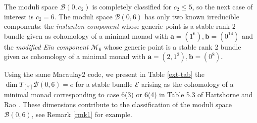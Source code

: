 \documentclass[twoside,reqno]{amsart}
\theoremstyle{plain}
\newcommand{\E}{\mathcal{E}}
\begin{document}
The moduli space $\mathcal{B}(0,c_2)$ is completely classified for $c_2\leq5$, so the next case of interest 
is $c_2=6$. The moduli space $\mathcal{B}(0,6)$ has only two known irreducible components: the \textit{instanton 
component} whose generic point is a stable rank 2 bundle given as cohomology of a minimal monad 
with $\boldsymbol{a}=(1^6), \boldsymbol{b}=(0^{14})$ and the \textit{modified Ein component} $\mathcal{M}_6$ whose 
generic point is a stable rank 2 bundle given as cohomology of a minimal monad with 
$\boldsymbol{a}=(2,1^2), \boldsymbol{b}=(0^{8})$.

 
Using the same Macaulay2 code, we present in Table \ref{ext-tab} the $\dim T_{[\E]}\mathcal{B}(0,6)=e$ 
for a stable bundle $\E$ arising as the cohomology of a minimal monad corresponding to case 6(3) or 6(4) in 
Table 5.3 of Hartshorne and Rao \cite{HR91}. These dimensions contribute to the classification of 
the moduli space $\mathcal{B}(0,6)$, see Remark \ref{rmk1} for example.
\end{document}
